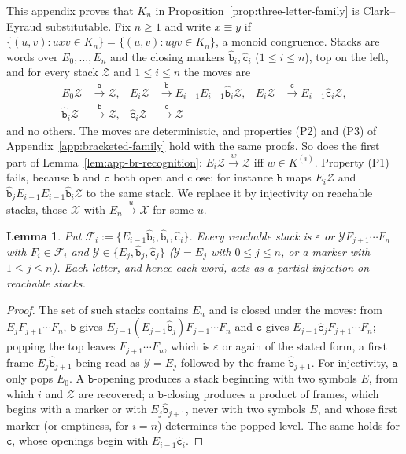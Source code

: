 \documentclass[11pt]{article}
\numberwithin{equation}{section}
\theoremstyle{plain}
\newtheorem{lemma}[theorem]{Lemma}
\theoremstyle{definition}
\theoremstyle{remark}
\newcommand{\eps}{\varepsilon}
\begin{document}
This appendix proves that $K_n$ in Proposition~\ref{prop:three-letter-family} is
Clark--Eyraud substitutable.  Fix $n\ge1$ and write $x\equiv y$ if
$\{(u,v):uxv\in K_n\}=\{(u,v):uyv\in K_n\}$, a monoid congruence.  Stacks are
words over $E_0,\ldots,E_n$ and the closing markers $\hat{\mathtt b}_i,\hat{\mathtt c}_i$
($1\le i\le n$), top on the left, and for every stack $\mathcal Z$ and $1\le i\le n$
the moves are
\[
\begin{aligned}
E_0\mathcal Z&\xrightarrow{\mathtt a}\mathcal Z,&
E_i\mathcal Z&\xrightarrow{\mathtt b}E_{i-1}E_{i-1}\hat{\mathtt b}_i\mathcal Z,&
E_i\mathcal Z&\xrightarrow{\mathtt c}E_{i-1}\hat{\mathtt c}_i\mathcal Z,\\
\hat{\mathtt b}_i\mathcal Z&\xrightarrow{\mathtt b}\mathcal Z,&
\hat{\mathtt c}_i\mathcal Z&\xrightarrow{\mathtt c}\mathcal Z
\end{aligned}
\]
and no others.  The moves are deterministic, and properties (P2) and (P3) of
Appendix~\ref{app:bracketed-family} hold with the same proofs.  So does the first
part of Lemma~\ref{lem:app-br-recognition}: $E_i\mathcal Z\xrightarrow{w}\mathcal Z$ iff
$w\in K^{(i)}$.  Property (P1) fails, because $\mathtt b$ and $\mathtt c$ both open
and close: for instance $\mathtt b$ maps $E_i\mathcal Z$ and
$\hat{\mathtt b}_jE_{i-1}E_{i-1}\hat{\mathtt b}_i\mathcal Z$ to the same stack.  We
replace it by injectivity on reachable stacks, those $\mathcal X$ with
$E_n\xrightarrow{u}\mathcal X$ for some $u$.

\begin{lemma}\label{lem:app-tl-reachable}
Put $\mathcal F_i:=\{E_{i-1}\hat{\mathtt b}_i,\hat{\mathtt b}_i,\hat{\mathtt c}_i\}$.
Every reachable stack is $\eps$ or $\mathcal YF_{j+1}\cdots F_n$ with
$F_i\in\mathcal F_i$ and $\mathcal Y\in\{E_j,\hat{\mathtt b}_j,\hat{\mathtt c}_j\}$
($\mathcal Y=E_j$ with $0\le j\le n$, or a marker with $1\le j\le n$).  Each
letter, and hence each word, acts as a partial injection on reachable stacks.
\end{lemma}

\begin{proof}
The set of such stacks contains $E_n$ and is closed under the moves: from
$E_jF_{j+1}\cdots F_n$, $\mathtt b$ gives $E_{j-1}(E_{j-1}\hat{\mathtt b}_j)F_{j+1}\cdots F_n$
and $\mathtt c$ gives $E_{j-1}\hat{\mathtt c}_jF_{j+1}\cdots F_n$; popping the top
leaves $F_{j+1}\cdots F_n$, which is $\eps$ or again of the stated form, a first
frame $E_j\hat{\mathtt b}_{j+1}$ being read as $\mathcal Y=E_j$ followed by the frame
$\hat{\mathtt b}_{j+1}$.  For injectivity, $\mathtt a$ only pops $E_0$.  A
$\mathtt b$-opening produces a stack beginning with two symbols $E$, from which
$i$ and $\mathcal Z$ are recovered; a $\mathtt b$-closing produces a product of
frames, which begins with a marker or with $E_j\hat{\mathtt b}_{j+1}$, never with two
symbols $E$, and whose first marker (or emptiness, for $i=n$) determines the
popped level.  The same holds for $\mathtt c$, whose openings begin with
$E_{i-1}\hat{\mathtt c}_i$.
\end{proof}
\end{document}

